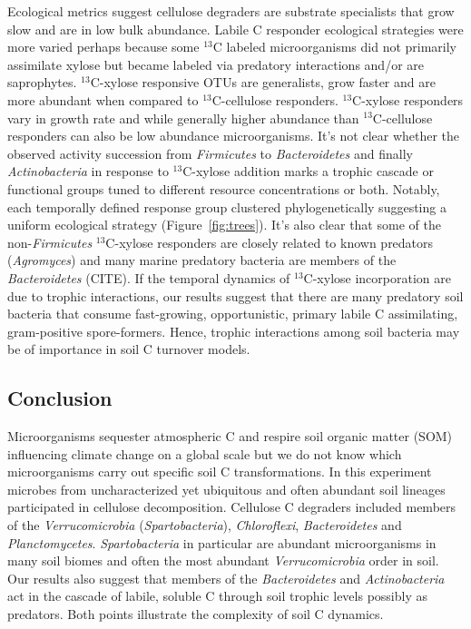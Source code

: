 Ecological metrics suggest cellulose degraders are substrate specialists that
grow slow and are in low bulk abundance. Labile C responder ecological
strategies were more varied perhaps because some $^{13}$C labeled
microorganisms did not primarily assimilate xylose but became labeled via
predatory interactions and/or are saprophytes. $^{13}$C-xylose responsive OTUs
are generalists, grow faster and are more abundant when compared to
$^{13}$C-cellulose responders. $^{13}$C-xylose responders vary in growth rate
and while generally higher abundance than $^{13}$C-cellulose responders can
also be low abundance microorganisms. It's not clear whether the observed
activity succession from \textit{Firmicutes} to \textit{Bacteroidetes} and
finally \textit{Actinobacteria} in response to $^{13}$C-xylose addition marks
a trophic cascade or functional groups tuned to different resource
concentrations or both. Notably, each temporally defined response group
clustered phylogenetically suggesting a uniform ecological strategy
(Figure~\ref{fig:trees}). It's also clear that some of the
non-\textit{Firmicutes} $^{13}$C-xylose responders are closely related to known
predators (\textit{Agromyces}) and many marine predatory bacteria are members
of the \textit{Bacteroidetes} (CITE). If the temporal dynamics of
$^{13}$C-xylose incorporation are due to trophic interactions, our results
suggest that there are many predatory soil bacteria that consume fast-growing,
opportunistic, primary labile C assimilating, gram-positive spore-formers.
Hence, trophic interactions among soil bacteria may be of importance in soil
C turnover models.

\subsection{Conclusion} 
Microorganisms sequester atmospheric C and respire soil organic matter (SOM)
influencing climate change on a global scale but we do not know which
microorganisms carry out specific soil C transformations. In this experiment
microbes from uncharacterized yet ubiquitous and often abundant soil lineages
participated in cellulose decomposition. Cellulose C degraders included members
of the \textit{Verrucomicrobia} (\textit{Spartobacteria}),
\textit{Chloroflexi}, \textit{Bacteroidetes} and \textit{Planctomycetes}.
\textit{Spartobacteria} in particular are abundant microorganisms in many soil
biomes and often the most abundant \textit{Verrucomicrobia} order in soil. Our
results also suggest that members of the \textit{Bacteroidetes} and
\textit{Actinobacteria} act in the cascade of labile, soluble C through soil
trophic levels possibly as predators. Both points illustrate the complexity of
soil C dynamics.
